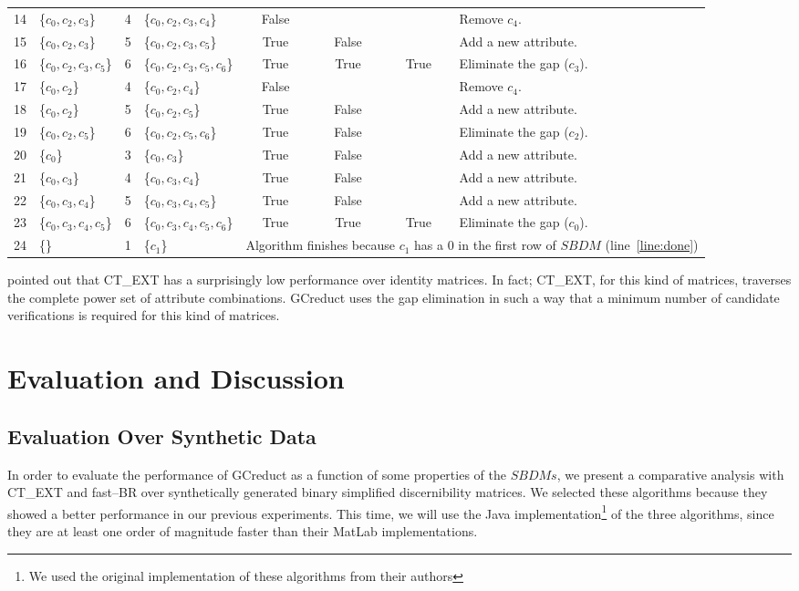 \documentclass[authoryear,preprint,review,12pt]{elsarticle}
\begin{document}
\begin{table}[!htb]
\begin{tabular}{|c|l|c|l|c|c|c|l|}
    		14 & \{$c_0,c_2,c_3$\} 		& 4 & \{$c_0,c_2,c_3,c_4$\}		& False &   &   & Remove $c_4$.\\
    		15 & \{$c_0,c_2,c_3$\}		& 5 & \{$c_0,c_2,c_3,c_5$\}		& True & False &   & Add a new attribute.\\
    		16 & \{$c_0,c_2,c_3,c_5$\}	& 6 & \{$c_0,c_2,c_3,c_5,c_6$\} 	& True & True & True & Eliminate the gap ($c_3$).\\
    		17 & \{$c_0,c_2$\} 			& 4 & \{$c_0,c_2,c_4$\}			& False &   &   & Remove $c_4$.\\
    		18 & \{$c_0,c_2$\}			& 5 & \{$c_0,c_2,c_5$\}			& True & False &   & Add a new attribute.\\
    		19 & \{$c_0,c_2,c_5$\}		& 6 & \{$c_0,c_2,c_5,c_6$\}		& True & False &   & Eliminate the gap ($c_2$).\\
    		20 & \{$c_0$\} 				& 3 & \{$c_0,c_3$\}				& True & False &   & Add a new attribute.\\    		
    		21 & \{$c_0,c_3$\}			& 4 & \{$c_0,c_3,c_4$\}			& True & False &   & Add a new attribute.\\
    		22 & \{$c_0,c_3,c_4$\}		& 5 & \{$c_0,c_3,c_4,c_5$\}		& True & False &   & Add a new attribute.\\
    		23 & \{$c_0,c_3,c_4,c_5$\}	& 6 & \{$c_0,c_3,c_4,c_5,c_6$\} 	& True & True & True & Eliminate the gap ($c_0$).\\
    		\hline
    		24 & \{\} 					& 1 & \{$c_1$\} 					& 
    		\multicolumn{4}{p{5cm}|}{Algorithm finishes because $c_1$ has a 0 in the first row of $SBDM$ (line~\ref{line:done})}\\
    		\hline
		\end{tabular}
	\end{table}
	
	\cite{Alba14} pointed out that CT\_EXT has a surprisingly low performance over identity matrices. 
	In fact; CT\_EXT, for this kind of matrices, traverses the complete power set of attribute combinations. 
	GCreduct uses the gap elimination in such a way that a minimum number of candidate verifications is required 
	for this kind of matrices.
%
\section{Evaluation and Discussion}\label{evaluation}

\subsection{Evaluation Over Synthetic Data}
	In order to evaluate the performance of GCreduct as a function of some properties of the $SBDMs$, we present a comparative analysis with CT\_EXT and fast--BR over synthetically generated binary simplified discernibility matrices. We selected these algorithms because they showed a better performance in our previous experiments. This time, we will use the Java implementation\footnote{We used the original implementation of these algorithms from their authors} of the three algorithms, since they are at least one order of magnitude faster than their MatLab implementations.
	
\end{document}
